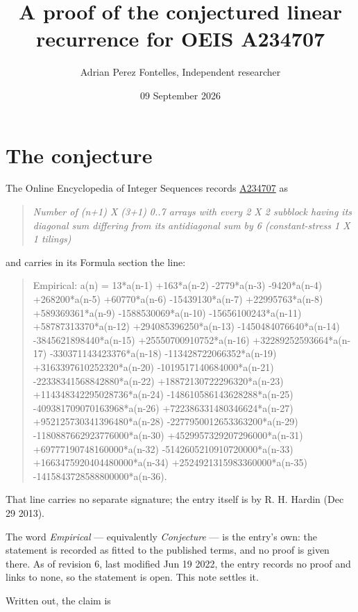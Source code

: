 \documentclass[11pt]{article}
\title{A proof of the conjectured linear recurrence for OEIS A234707}
\author{Adrian Perez Fontelles, Independent researcher}
\date{09 September 2026}
\theoremstyle{definition}
\begin{document}
\maketitle
\section{The conjecture}

The Online Encyclopedia of Integer Sequences records \href{https://oeis.org/A234707}{A234707} as

\begin{quote}\itshape Number of (n+1) X (3+1) 0..7 arrays with every 2 X 2 subblock having its diagonal sum differing from its antidiagonal sum by 6 (constant-stress 1 X 1 tilings)\end{quote}

and carries in its Formula section the line:

\begin{quote}\ttfamily Empirical: a(n) = 13*a(n-1) +163*a(n-2) -2779*a(n-3) -9420*a(n-4) +268200*a(n-5) +60770*a(n-6) -15439130*a(n-7) +22995763*a(n-8) +589369361*a(n-9) -1588530069*a(n-10) -15656100243*a(n-11) +58787313370*a(n-12) +294085396250*a(n-13) -1450484076640*a(n-14) -3845621898440*a(n-15) +25550700910752*a(n-16) +32289252593664*a(n-17) -330371143423376*a(n-18) -113428722066352*a(n-19) +3163397610252320*a(n-20) -1019517140684000*a(n-21) -22338341568842880*a(n-22) +18872130722296320*a(n-23) +114348342295028736*a(n-24) -148610586143628288*a(n-25) -409381709070163968*a(n-26) +722386331480346624*a(n-27) +952125730341396480*a(n-28) -2277950012653363200*a(n-29) -1180887662923776000*a(n-30) +4529957329207296000*a(n-31) +69777190748160000*a(n-32) -5142605210910720000*a(n-33) +1663475920404480000*a(n-34) +2524921315983360000*a(n-35) -1415843728588800000*a(n-36).\end{quote}

That line carries no separate signature; the entry itself is by R. H. Hardin (Dec 29 2013).

The word {\itshape Empirical} --- equivalently {\itshape Conjecture} --- is the entry's own: the statement is recorded as fitted to the published terms, and no proof is given there. As of revision 6, last modified Jun 19 2022, the entry records no proof and links to none, so the statement is open. This note settles it.

Written out, the claim is
\end{document}
